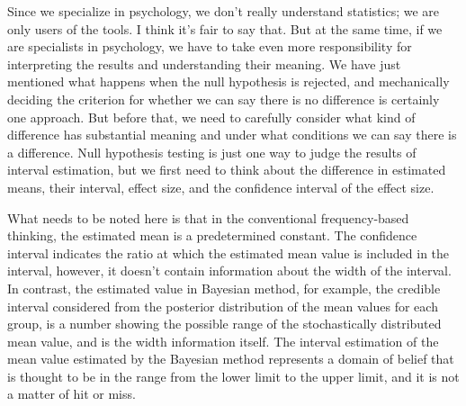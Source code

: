 \documentclass{ltjbook}
\begin{document}
Since we specialize in psychology, we don't really understand statistics; we are only users of the tools. I think it's fair to say that. But at the same time, if we are specialists in psychology, we have to take even more responsibility for interpreting the results and understanding their meaning. We have just mentioned what happens when the null hypothesis is rejected, and mechanically deciding the criterion for whether we can say there is no difference is certainly one approach. But before that, we need to carefully consider what kind of difference has substantial meaning and under what conditions we can say there is a difference. Null hypothesis testing is just one way to judge the results of interval estimation, but we first need to think about the difference in estimated means, their interval, effect size, and the confidence interval of the effect size.

What needs to be noted here is that in the conventional frequency-based thinking, the estimated mean is a predetermined constant. The confidence interval indicates the ratio at which the estimated mean value is included in the interval, however, it doesn't contain information about the width of the interval. In contrast, the estimated value in Bayesian method, for example, the credible interval considered from the posterior distribution of the mean values for each group, is a number showing the possible range of the stochastically distributed mean value, and is the width information itself. The interval estimation of the mean value estimated by the Bayesian method represents a domain of belief that is thought to be in the range from the lower limit to the upper limit, and it is not a matter of hit or miss.
\end{document}
